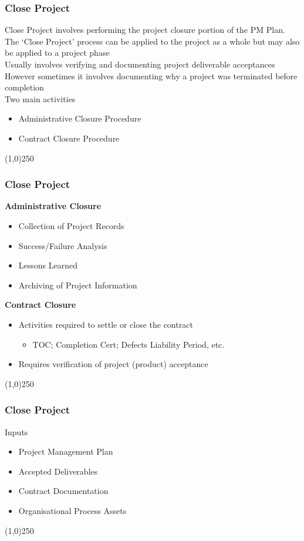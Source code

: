 \begin{frame}
\frametitle{Close Project}
Close Project involves performing the project closure portion of the PM Plan.\\
The `Close Project' process can be applied to the project as a whole but may also be applied to a project phase\\
Usually involves verifying and documenting project deliverable acceptances\\
However sometimes it involves documenting why a project was terminated before completion\\
Two main activities\\
\begin{itemize}
	\item Administrative Closure Procedure
	\item Contract Closure Procedure
\end{itemize}
\end{frame}\begin{center}\line(1,0){250}\end{center}
%
%

\begin{frame}
\frametitle{Close Project}
\textbf{Administrative Closure}
\begin{itemize}
	\item Collection of Project Records
	\item Success/Failure Analysis
	\item Lessons Learned
	\item Archiving of Project Information
\end{itemize}
\textbf{Contract Closure}
\begin{itemize}
	\item Activities required to settle or close the contract
		\begin{itemize}
			\item TOC; Completion Cert; Defects Liability Period, etc.
		\end{itemize}
	\item Requires verification of project (product) acceptance
\end{itemize}
\end{frame}\begin{center}\line(1,0){250}\end{center}
%
%

\begin{frame}
\frametitle{Close Project}
Inputs
\begin{itemize}
	\item Project Management Plan
	\item Accepted Deliverables
	\item Contract Documentation
	\item Organisational Process Assets
\end{itemize}
\end{frame}\begin{center}\line(1,0){250}\end{center}
%
%


